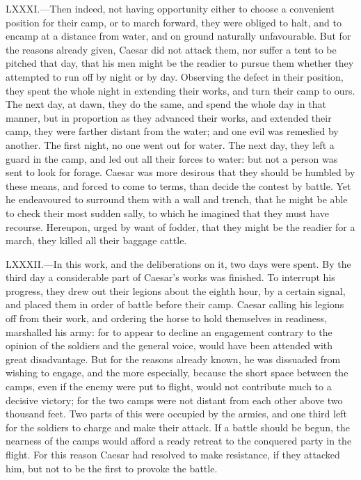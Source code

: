 LXXXI.—Then indeed, not having opportunity either to choose a
convenient position for their camp, or to march forward, they were
obliged to halt, and to encamp at a distance from water, and on ground
naturally unfavourable. But for the reasons already given, Caesar did
not attack them, nor suffer a tent to be pitched that day, that his men
might be the readier to pursue them whether they attempted to run off by
night or by day. Observing the defect in their position, they spent the
whole night in extending their works, and turn their camp to ours. The
next day, at dawn, they do the same, and spend the whole day in that
manner, but in proportion as they advanced their works, and extended
their camp, they were farther distant from the water; and one evil was
remedied by another. The first night, no one went out for water. The
next day, they left a guard in the camp, and led out all their forces to
water: but not a person was sent to look for forage. Caesar was more
desirous that they should be humbled by these means, and forced to come
to terms, than decide the contest by battle. Yet he endeavoured to
surround them with a wall and trench, that he might be able to check
their most sudden sally, to which he imagined that they must have
recourse. Hereupon, urged by want of fodder, that they might be the
readier for a march, they killed all their baggage cattle.

LXXXII.—In this work, and the deliberations on it, two days were spent.
By the third day a considerable part of Caesar's works was finished. To
interrupt his progress, they drew out their legions about the eighth
hour, by a certain signal, and placed them in order of battle before
their camp. Caesar calling his legions off from their work, and ordering
the horse to hold themselves in readiness, marshalled his army: for to
appear to decline an engagement contrary to the opinion of the soldiers
and the general voice, would have been attended with great disadvantage.
But for the reasons already known, he was dissuaded from wishing to
engage, and the more especially, because the short space between the
camps, even if the enemy were put to flight, would not contribute much
to a decisive victory; for the two camps were not distant from each
other above two thousand feet. Two parts of this were occupied by the
armies, and one third left for the soldiers to charge and make their
attack. If a battle should be begun, the nearness of the camps would
afford a ready retreat to the conquered party in the flight. For this
reason Caesar had resolved to make resistance, if they attacked him, but
not to be the first to provoke the battle.

